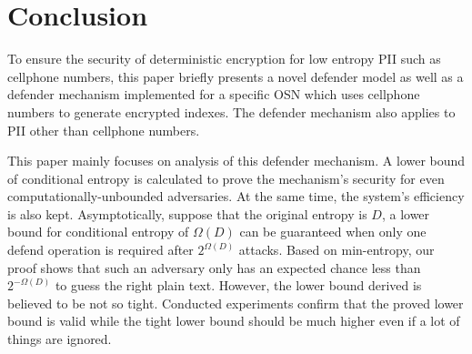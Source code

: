 \documentclass[10pt, conference, compsocconf]{IEEEtran}
\begin{document}
%





\section{Conclusion}
    To ensure the security of deterministic encryption
    for low entropy PII such as cellphone numbers,
    this paper briefly presents a novel defender model as well
    as a defender mechanism implemented for a specific
    OSN which uses cellphone numbers to generate encrypted indexes.
    The defender mechanism also applies to PII other than
    cellphone numbers.

    This paper mainly focuses on analysis of this defender mechanism.
    A lower bound of conditional entropy is calculated to
    prove the mechanism's security for even
    computationally-unbounded adversaries.
    At the same time, the system's efficiency is also kept.
    Asymptotically, suppose that the original entropy is $D$,
    a lower bound for conditional entropy of $\Omega(D)$ can be
    guaranteed when only one defend operation is required after
    $2^{\Omega(D)}$ attacks.
    Based on min-entropy, our proof shows that
    such an adversary only has an expected chance
    less than $2^{-\Omega(D)}$ to guess the right plain text.
    However, the lower bound derived
    is believed to be not so tight.
    Conducted experiments confirm that the proved lower bound is valid while
    the tight lower bound
    should be much higher even if a lot of things are ignored.
\end{document}
